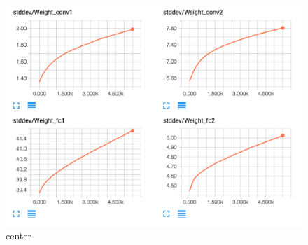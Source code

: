 \documentclass[12pt]{article}
\begin{document}
\begin{figure}[H]
  \caption{center}
  \centering
    \includegraphics[scale=0.3]{bst1.png}
\end{figure}
\end{document}
